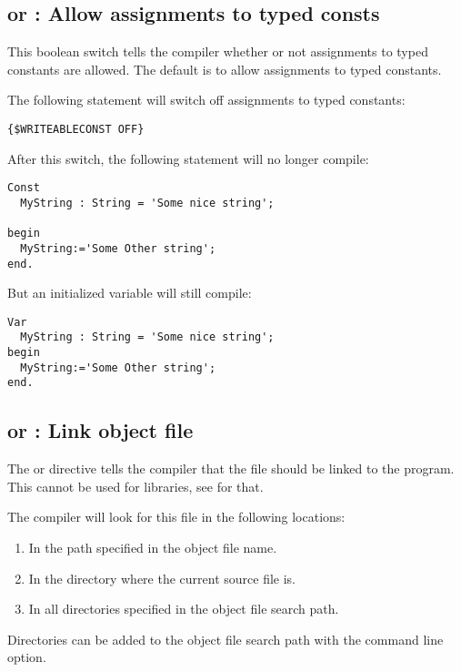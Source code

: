 %
%

\subsection{ or  : Allow
assignments to typed consts}
This boolean switch tells the compiler whether or not assignments to typed 
constants are allowed. The default is to allow assignments to typed constants.

The following statement will switch off assignments to typed constants:
\begin{verbatim}
{$WRITEABLECONST OFF}
\end{verbatim}
After this switch, the following statement will no longer compile:
\begin{verbatim}
Const
  MyString : String = 'Some nice string';

begin
  MyString:='Some Other string';
end.
\end{verbatim}
But an initialized variable will still compile:
\begin{verbatim}
Var
  MyString : String = 'Some nice string';
begin
  MyString:='Some Other string';
end.
\end{verbatim}



\subsection{ or  : Link object file}

The  or  directive
tells the compiler that the file  should be linked to
the program. This cannot be used for libraries, see  for that.

The compiler will look for this file in the following locations:
\begin{enumerate}
\item In the path specified in the object file name.
\item In the directory where the current source file is.
\item In all directories specified in the object file search path.
\end{enumerate}
Directories can be added to the object file search path with the 
command line option.

